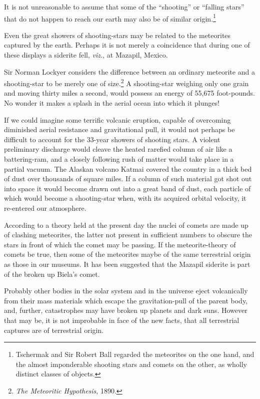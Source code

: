 \documentclass[a4paper, 12pt, oneside]{article}
\begin{document}
It is not unreasonable to assume that some of the ``shooting'' or ``falling stars'' that do not happen to reach our earth may also be of similar origin.\footnote{Tschermak and Sir Robert Ball regarded the meteorites on the one hand, and the almost imponderable shooting stars and comets on the other, as wholly distinct classes of objects.}

Even the great showers of shooting-stars may be related to the meteorites captured by the earth. Perhaps it is not merely a coincidence that during one of these displays a siderite fell, \emph{viz.}, at Mazapil, Mexico.

Sir Norman Lockyer considers the difference between an ordinary meteorite and a shooting-star to be merely one of size.\footnote{\emph{The Meteoritic Hypothesis}, 1890.} A shooting-star weighing only one grain and moving thirty miles a second, would possess an energy of 55,675 foot-pounds. No wonder it makes a splash in the aerial ocean into which it plunges!

If we could imagine some terrific volcanic eruption, capable of overcoming diminished aerial resistance and gravitational pull, it would not perhaps be difficult to account for the 33-year showers of shooting stars. A violent preliminary discharge would cleave the heated rarefied column of air like a battering-ram, and a closely following rush of matter would take place in a partial vacuum. The Alaskan volcano Katmai covered the country in a thick bed of dust over thousands of square miles. If a column of such material got shot out into space it would become drawn out into a great band of dust, each particle of which would become a shooting-star when, with its acquired orbital velocity, it re-entered our atmosphere.

According to a theory held at the present day the nuclei of comets are made up of clashing meteorites, the latter not present in sufficient numbers to obscure the stars in front of which the comet may be passing. If the meteorite-theory of comets be true, then some of the meteorites maybe of the same terrestrial origin as those in our museums. It has been suggested that the Mazapil siderite is part of the broken up Biela's comet.

Probably other bodies in the solar system and in the universe eject volcanically from their mass materials which escape the gravitation-pull of the parent body, and, further, catastrophes may have broken up planets and dark suns. However that may be, it is not improbable in face of the new facts, that all terrestrial captures are of terrestrial origin.
\end{document}
